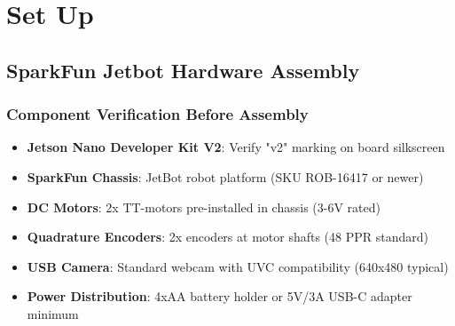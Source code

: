 %
%

\chapter{Set Up}

\section{SparkFun Jetbot Hardware Assembly}

\subsection{Component Verification Before Assembly}
\begin{itemize}
    \item \textbf{Jetson Nano Developer Kit V2}: Verify "v2" marking on board silkscreen
    \item \textbf{SparkFun Chassis}: JetBot robot platform (SKU ROB-16417 or newer)
    \item \textbf{DC Motors}: 2x TT-motors pre-installed in chassis (3-6V rated)
    \item \textbf{Quadrature Encoders}: 2x encoders at motor shafts (48 PPR standard)
    \item \textbf{USB Camera}: Standard webcam with UVC compatibility (640x480 typical)
    \item \textbf{Power Distribution}: 4xAA battery holder or 5V/3A USB-C adapter minimum
\end{itemize}
